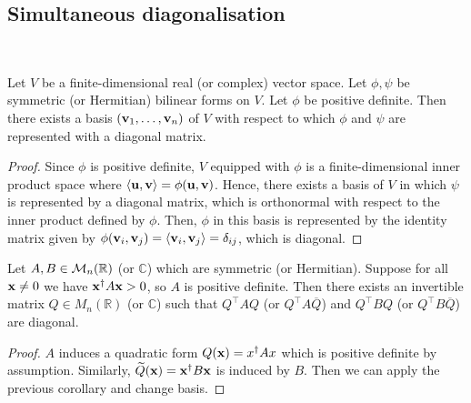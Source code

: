 \documentclass[a4paper]{article}
\begin{document}
\subsection{Simultaneous diagonalisation}
\ \vspace*{-1.5em}
\begin{corollary}
	Let \( V \) be a finite-dimensional real (or complex) vector space.
	Let \( \phi, \psi \) be symmetric (or Hermitian) bilinear forms on \( V \).
	Let \( \phi \) be positive definite.
	Then there exists a basis \( ({\bf v}_1, \dots, {\bf v}_n) \) of \( V \) with respect to which \( \phi \) and \( \psi \) are represented with a diagonal matrix.
\end{corollary}
\begin{proof}
	Since \( \phi \) is positive definite, \( V \) equipped with \( \phi \) is a finite-dimensional inner product space where \( \left\langle{{\bf u},{\bf v}}\right\rangle = \phi({\bf u},{\bf v}) \).
	Hence, there exists a basis of \( V \) in which \( \psi \) is represented by a diagonal matrix, which is orthonormal with respect to the inner product defined by \( \phi \).
	Then, \( \phi \) in this basis is represented by the identity matrix given by \( \phi({\bf v}_i, {\bf v}_j) = \left\langle{{\bf v}_i, {\bf v}_j}\right\rangle = \delta_{ij} \), which is diagonal.
\end{proof}
\begin{corollary}
	Let \( A, B \in {\mathcal{M}}_n(\mathbb R) \) (or \( \mathbb C \)) which are symmetric (or Hermitian).
	Suppose for all \( {\bf x} \neq 0 \) we have \( {\bf x}^\dagger A {\bf x} > 0 \), so \( A \) is positive definite.
	Then there exists an invertible matrix \( Q \in M_n(\mathbb R) \) (or \( \mathbb C \)) such that \( Q^\top A Q \) (or \( Q^\top A \overline{Q} \)) and \( Q^\top B Q \) (or \( Q^\top B \overline{Q} \)) are diagonal.
\end{corollary}
\begin{proof}
	\( A \) induces a quadratic form \( Q({\bf x}) = x^\dagger A x \) which is positive definite by assumption.
	Similarly, \( \widetilde Q({\bf x}) = {\bf x}^\dagger B {\bf x} \) is induced by \( B \).
	Then we can apply the previous corollary and change basis.
\end{proof}
\end{document}
